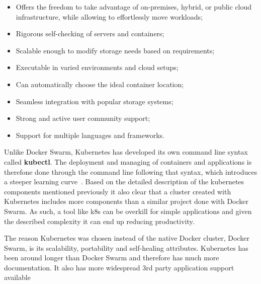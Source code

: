 \begin{itemize}
    \item Offers the freedom to take advantage of on-premises, hybrid, or public cloud infrastructure, while allowing to effortlessly move workloads;
    \item Rigorous self-checking of servers and containers;
    \item Scalable enough to modify storage needs based on requirements;
    \item Executable in varied environments and cloud setups;
    \item Can automatically choose the ideal container location;
    \item Seamless integration with popular storage systems;
    \item Strong and active user community support;
    \item Support for multiple languages and frameworks.
\end{itemize}


Unlike Docker Swarm, Kubernetes has developed its own command line syntax called \textbf{kubectl}. The deployment and managing of containers and applications is therefone done through the command line following that syntax, which introduces a steeper learning curve~\cite{kubernetes-difficult-to-learn}. Based on the detailed description of the kubernetes components mentioned previously it also clear that a cluster created with Kubernetes includes more components than a similar project done with Docker Swarm. As such, a tool like \acrshort{k8s} can be overkill for simple applications and given the described complexity it can end up reducing productivity.

The reason Kubernetes was chosen instead of the native Docker cluster, Docker Swarm, is its scalability, portability and self-healing attributes. Kubernetes has been around longer than Docker Swarm and therefore has much more documentation. It also has more widespread 3rd party application support available


